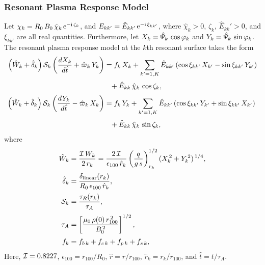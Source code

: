 \documentclass[12pt,prb,aps]{revtex4-1}
\begin{document}
\subsubsection{Resonant Plasma Response Model}\label{res}
Let ${\mit\chi}_k= R_0\,B_0\,\hat{\chi}_k\,{\rm e}^{-{\rm i}\,\zeta_k}$, and $E_{kk'}=\hat{E}_{kk'}\,{\rm e}^{-{\rm i}\,\xi_{kk'}}$,
where  $\hat{\chi}_k>0$, $\zeta_k$, $\hat{E}_{kk}'>0$, and $\xi_{kk'}$ are all real quantities. Furthermore,
let $X_k= \hat{\mit\Psi}_k\,\cos\varphi_k$ and $Y_k= \hat{\mit\Psi}_k\,\sin\varphi_k$. The resonant plasma response model at the 
$k$th resonant surface takes the form
\begin{align}\label{e21}
\left(\hat{W}_k +\hat{\delta}_k\right){\cal S}_k\left(\frac{dX_k}{d\hat{t}} 
+\hat{\varpi}_k\,Y_k\right)&= f_k\,X_k+ \sum_{k'=1,K}\hat{E}_{kk'}\,(\cos\xi_{kk'}\,X_{k'}  -\sin\xi_{kk'}\,Y_{k'})\nonumber\\[0.5ex] &\phantom{=}+ \hat{E}_{kk}\,\hat{\chi}_k\,\cos\zeta_k,\\[0.5ex]
\left(\hat{W}_k +\hat{\delta}_k\right){\cal S}_k\left(\frac{dY_k}{d\hat{t}} -\hat{\varpi}_k\,X_k\right)
&= f_k\,Y_k + \sum_{k'=1,K}\hat{E}_{kk'}\,(\cos\xi_{kk'}\,Y_{k'}
+\sin\xi_{kk'}\,X_{k'}) \nonumber\\[0.5ex]
&\phantom{=}+ \hat{E}_{kk}\,\hat{\chi}_k\,\sin\zeta_k,\label{e22}
\end{align}
where
\begin{align}\label{e23}
\hat{W}_k &=\frac{{\cal I}\,W_k}{2\,r_k}=\frac{2\,{\cal I}}{\epsilon_{100}\,\hat{r}_k}\left(\frac{q}{g\,s}\right)^{1/2}_{r_k} (X_k^{\,2} + Y_k^{\,2})^{\,1/4},\\[0.5ex]
\hat{\delta}_k &= \frac{\delta_{\rm linear}(r_k)}{R_0\,\epsilon_{100}\,\hat{r}_k},\\[0.5ex]
{\cal S}_k&=\frac{\tau_R(r_k)}{\tau_A},\\[0.5ex]
\tau_A &= \left[\frac{\mu_0\,\rho(0)\,r_{100}^{\,2}}{B_0^{\,2}}\right]^{1/2},\\[0.5ex]
f_k &=f_{b\,k}+f_{c\,k} + f_{p\,k} + f_{s\,k},
\end{align}
Here, ${\cal I} = 0.8227$, $\epsilon_{100}=r_{100}/R_0$, $\hat{r}=r/r_{100}$, $\hat{r}_k=r_k/r_{100}$, and $\hat{t}=t/\tau_A$. 
\end{document}
